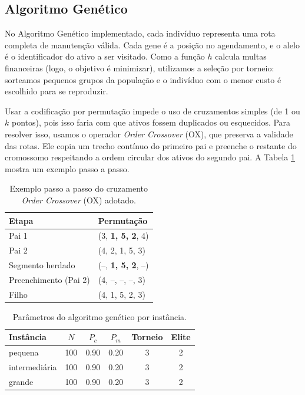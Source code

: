 \subsection{Algoritmo Genético}
\label{subsec:genetico}

No Algoritmo Genético implementado, cada indivíduo representa uma rota completa de manutenção válida. Cada gene é a posição no agendamento, e o alelo é o identificador do ativo a ser visitado. Como a função $h$ calcula multas financeiras (logo, o objetivo é minimizar), utilizamos a seleção por torneio: sorteamos pequenos grupos da população e o indivíduo com o menor custo é escolhido para se reproduzir.

Usar a codificação por permutação impede o uso de cruzamentos simples (de 1 ou $k$ pontos), pois isso faria com que ativos fossem duplicados ou esquecidos. Para resolver isso, usamos o operador \textit{Order Crossover} (OX), que preserva a validade das rotas. Ele copia um trecho contínuo do primeiro pai e preenche o restante do cromossomo respeitando a ordem circular dos ativos do segundo pai. A Tabela \ref{tab:ag-cruzamento} mostra um exemplo passo a passo.

\begin{table}[H]
\centering
\caption{Exemplo passo a passo do cruzamento \textit{Order Crossover} (OX) adotado.}
\label{tab:ag-cruzamento}
\begin{tabular}{ll}
\toprule
Etapa                   & Permutação \\
\midrule
Pai 1                   & (3, \textbf{1, 5, 2}, 4) \\
Pai 2                   & (4, 2, 1, 5, 3) \\
Segmento herdado        & (--, \textbf{1, 5, 2}, --) \\
Preenchimento (Pai 2)   & (4, --, --, --, 3) \\
Filho                   & (4, 1, 5, 2, 3) \\
\bottomrule
\end{tabular}
\end{table}

\begin{table}[H]
\centering
\caption{Parâmetros do algoritmo genético por instância.}
\label{tab:ag-parametros}
\begin{tabular}{lccccc}
\toprule
Instância     & $N$ & $P_c$ & $P_m$ & Torneio & Elite \\
\midrule
pequena & 100 & 0.90 & 0.20 & 3 & 2 \\
intermedi\'aria & 100 & 0.90 & 0.20 & 3 & 2 \\
grande & 100 & 0.90 & 0.20 & 3 & 2 \\
\bottomrule
\end{tabular}
\end{table}

